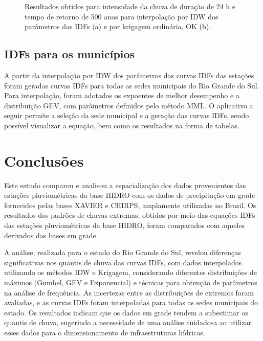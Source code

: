 \documentclass[
]{agujournal2019}
\begin{document}
\begin{figure}
\begin{minipage}{\linewidth}
{}


\end{minipage}%

\caption{\label{fig-Figura35}Resultados obtidos para intensidade da
chuva de duração de 24 h e tempo de retorno de 500 anos para
interpolação por IDW dos parâmetros das IDFs (a) e por krigagem
ordinária, OK (b).}

\end{figure}%

\subsection{IDFs para os municípios}\label{idfs-para-os-municuxedpios}

A partir da interpolação por IDW dos parâmetros das curvas IDFs das
estações foram geradas curvas IDFs para todas as sedes municipais do Rio
Grande do Sul. Para interpolação, foram adotados os expoentes de melhor
desempenho e a distribuição GEV, com parâmetros definidos pelo método
MML. O aplicativo a seguir permite a seleção da sede municipal e a
geração das curvas IDFs, sendo possível visualizar a equação, bem como
os resultados na forma de tabelas.

\section{Conclusões}\label{conclusuxf5es}

Este estudo comparou e analisou a espacialização dos dados provenientes
das estações pluviométricas da base HIDRO com os dados de precipitação
em grade fornecidos pelas bases XAVIER e CHIRPS, amplamente utilizadas
no Brasil. Os resultados dos padrões de chuvas extremas, obtidos por
meio das equações IDFs das estações pluviométricas da base HIDRO, foram
comparados com aqueles derivados das bases em grade.

A análise, realizada para o estado do Rio Grande do Sul, revelou
diferenças significativas nos quantis de chuva das curvas IDFs, com
dados interpolados utilizando os métodos IDW e Krigagem, considerando
diferentes distribuições de máximos (Gumbel, GEV e Exponencial) e
técnicas para obtenção de parâmetros na análise de frequência. As
incertezas entre as distribuições de extremos foram avaliadas, e as
curvas IDFs foram interpoladas para todas as sedes municipais do estado.
Os resultados indicam que os dados em grade tendem a subestimar os
quantis de chuva, sugerindo a necessidade de uma análise cuidadosa ao
utilizar esses dados para o dimensionamento de infraestruturas hídricas.
\end{document}
